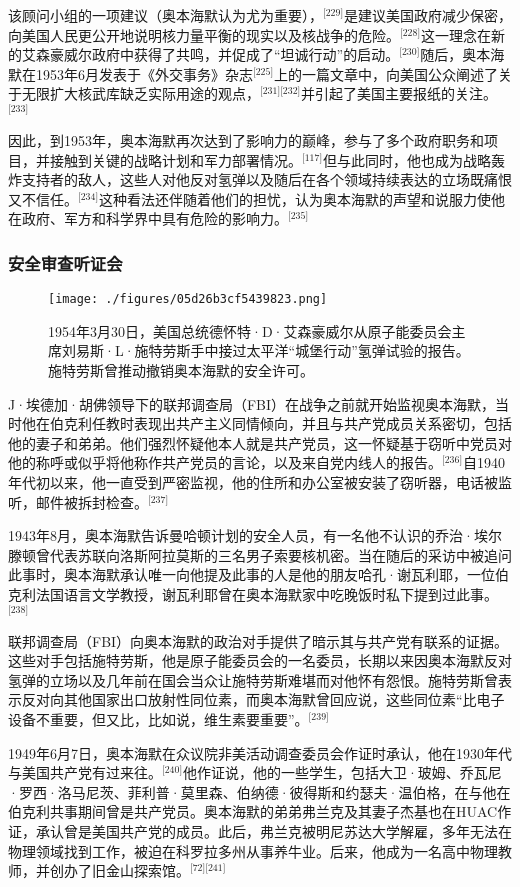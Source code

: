 该顾问小组的一项建议（奥本海默认为尤为重要），\(^\text{[229]}\)是建议美国政府减少保密，向美国人民更公开地说明核力量平衡的现实以及核战争的危险。\(^\text{[228]}\)这一理念在新的艾森豪威尔政府中获得了共鸣，并促成了“坦诚行动”的启动。\(^\text{[230]}\)随后，奥本海默在1953年6月发表于《外交事务》杂志\(^\text{[225]}\)上的一篇文章中，向美国公众阐述了关于无限扩大核武库缺乏实际用途的观点，\(^\text{[231][232]}\)并引起了美国主要报纸的关注。\(^\text{[233]}\)

因此，到1953年，奥本海默再次达到了影响力的巅峰，参与了多个政府职务和项目，并接触到关键的战略计划和军力部署情况。\(^\text{[117]}\)但与此同时，他也成为战略轰炸支持者的敌人，这些人对他反对氢弹以及随后在各个领域持续表达的立场既痛恨又不信任。\(^\text{[234]}\)这种看法还伴随着他们的担忧，认为奥本海默的声望和说服力使他在政府、军方和科学界中具有危险的影响力。\(^\text{[235]}\)
\subsubsection{安全审查听证会}
\begin{figure}[ht]
\centering
\texttt{[image: ./figures/05d26b3cf5439823.png]}
\caption{1954年3月30日，美国总统德怀特·D·艾森豪威尔从原子能委员会主席刘易斯·L·施特劳斯手中接过太平洋“城堡行动”氢弹试验的报告。施特劳斯曾推动撤销奥本海默的安全许可。} \label{fig_ABHM_12}
\end{figure}
J·埃德加·胡佛领导下的联邦调查局（FBI）在战争之前就开始监视奥本海默，当时他在伯克利任教时表现出共产主义同情倾向，并且与共产党成员关系密切，包括他的妻子和弟弟。他们强烈怀疑他本人就是共产党员，这一怀疑基于窃听中党员对他的称呼或似乎将他称作共产党员的言论，以及来自党内线人的报告。\(^\text{[236]}\)自1940年代初以来，他一直受到严密监视，他的住所和办公室被安装了窃听器，电话被监听，邮件被拆封检查。\(^\text{[237]}\)

1943年8月，奥本海默告诉曼哈顿计划的安全人员，有一名他不认识的乔治·埃尔滕顿曾代表苏联向洛斯阿拉莫斯的三名男子索要核机密。当在随后的采访中被追问此事时，奥本海默承认唯一向他提及此事的人是他的朋友哈孔·谢瓦利耶，一位伯克利法国语言文学教授，谢瓦利耶曾在奥本海默家中吃晚饭时私下提到过此事。\(^\text{[238]}\)

联邦调查局（FBI）向奥本海默的政治对手提供了暗示其与共产党有联系的证据。这些对手包括施特劳斯，他是原子能委员会的一名委员，长期以来因奥本海默反对氢弹的立场以及几年前在国会当众让施特劳斯难堪而对他怀有怨恨。施特劳斯曾表示反对向其他国家出口放射性同位素，而奥本海默曾回应说，这些同位素“比电子设备不重要，但又比，比如说，维生素要重要”。\(^\text{[239]}\)

1949年6月7日，奥本海默在众议院非美活动调查委员会作证时承认，他在1930年代与美国共产党有过来往。\(^\text{[240]}\)他作证说，他的一些学生，包括大卫·玻姆、乔瓦尼·罗西·洛马尼茨、菲利普·莫里森、伯纳德·彼得斯和约瑟夫·温伯格，在与他在伯克利共事期间曾是共产党员。奥本海默的弟弟弗兰克及其妻子杰基也在HUAC作证，承认曾是美国共产党的成员。此后，弗兰克被明尼苏达大学解雇，多年无法在物理领域找到工作，被迫在科罗拉多州从事养牛业。后来，他成为一名高中物理教师，并创办了旧金山探索馆。\(^\text{[72][241]}\)

